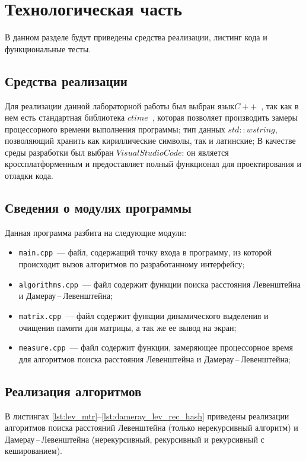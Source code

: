 \chapter{Технологическая часть}

В данном разделе будут приведены средства реализации, листинг кода и функциональные тесты.

\section{Средства реализации}

Для реализации данной лабораторной работы был выбран язык\break$C++$~\cite{cpp-lang}, так как в нем есть стандартная библиотека $ctime$~\cite{cpp-lang-time}, которая позволяет производить замеры процессорного времени выполнения программы; тип данных $std::wstring$, позволяющий хранить как кириллические символы, так и латинские;
В качестве среды разработки был выбран $Visual Studio Code$: он является кроссплатформенным и предоставляет полный функционал для проектирования и отладки кода.
 
\section{Сведения о модулях программы}

Данная программа разбита на следующие модули:

\begin{itemize}
	\item \texttt{main.cpp}~--- файл, содержащий точку входа в программу, из которой происходит вызов алгоритмов по разработанному интерфейсу;
	\item \texttt{algorithms.cpp}~--- файл содержит функции поиска расстояния Левенштейна и \break Дамерау\,--\,Левенштейна;
	\item \texttt{matrix.cpp}~--- файл содержит функции динамического выделения и очищения памяти для матрицы, а так же ее вывод на экран;
	\item \texttt{measure.cpp}~--- файл содержит функции, замеряющее процессорное время для алгоритмов поиска расстояния Левенштейна и Дамерау\,--\,Левенштейна;
\end{itemize}

\section{Реализация алгоритмов}

В листингах \ref{lst:lev_mtr}--\ref{lst:dameray_lev_rec_hash} приведены реализации алгоритмов поиска расстояний Левенштейна (только нерекурсивный алгоритм) и \break Дамерау\,--\,Левенштейна (нерекурсивный, рекурсивный и рекурсивный с кешированием).

